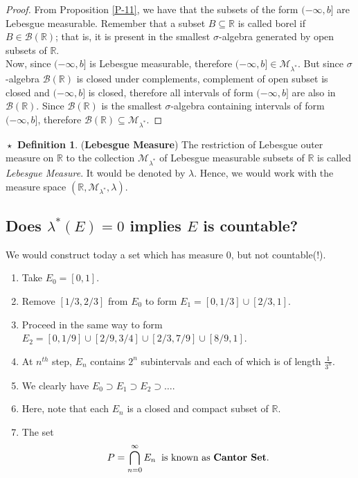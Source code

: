 \documentclass{article}
\theoremstyle{definition}
\newtheorem{definition}{$\boxed{\star}$ Definition}
\theoremstyle{remark}
\theoremstyle{definition}
\theoremstyle{definition}
\theoremstyle{definition}
\newcommand{\union}{\cup}
\newcommand{\bintrs}{\bigcap}
\newcommand{\R}{\mathbb{R}}
\newcommand{\bor}[1]{\mathscr{B}(#1)}
\newcommand{\lom}[1]{\lambda^*\left (#1\right )}
\newcommand{\set}[1]{\mathscr{#1}}
\newcommand{\msigm}[1]{\set{M}_{#1}}
\begin{document}
\begin{proof}
	From Proposition \ref{P-11}, we have that the subsets of the form $ (-\infty,b] $ are Lebesgue measurable. Remember that a subset $ B\subseteq \R $ is called borel if $ B\in \bor{\R} $; that is, it is present in the smallest $ \sigma $-algebra generated by open subsets of $ \R $. \\
	Now, since $ (-\infty,b] $ is Lebesgue measurable, therefore $ (-\infty,b] \in \msigm{\lambda^*} $. But since $ \sigma $-algebra $ \bor{\R} $ is closed under complements, complement of open subset is closed and $ (-\infty,b] $ is closed, therefore all intervals of form $ (-\infty,b] $ are also in $ \bor{\R} $. Since $ \bor{\R} $ is the smallest $ \sigma $-algebra containing intervals of form $ (-\infty,b] $, therefore $ \bor{\R} \subseteq \msigm{\lambda^*} $.
\end{proof}
\hrulefill
\newpage
\begin{definition}
	(\textbf{Lebesgue Measure}) The restriction of Lebesgue outer measure on $ \R $ to the collection $ \msigm{\lambda^*} $ of Lebesgue measurable subsets of $ \R $ is called \emph{Lebesgue Measure}. It would be denoted by $ \lambda $. Hence, we would work with the measure space $ (\R,\msigm{\lambda^*},\lambda) $.
\end{definition}
\hrulefill
\subsection{Does $ \lom{E} = 0 $ implies $ E $ is countable?}
We would construct today a set which has measure 0, but not countable(!).
\begin{enumerate}
	\item {Take $ E_0 = [0,1] $.}
	\item {Remove $ [1/3,2/3] $ from $ E_0 $ to form $ E_1 = [0,1/3] \union [2/3,1] $.}
	\item {Proceed in the same way to form $ E_2 = [0,1/9]\union [2/9,3/4] \union [2/3,7/9]\union [8/9,1] $.}
	\item {At $ n^{th} $ step, $ E_n $ contains $ 2^n $ subintervals and each of which is of length $ \frac{1}{3^n} $.}
	\item {We clearly have $ E_0 \supset E_1 \supset E_2 \supset \dots $.}
	\item {Here, note that each $ E_n $ is a closed and compact subset of $ \R $.}
	\item {The set 
\[P = \bintrs_{n=0}^{\infty} E_n \;\;\text{is known as \textbf{Cantor Set}.}\]	
}
\end{enumerate}
\end{document}
